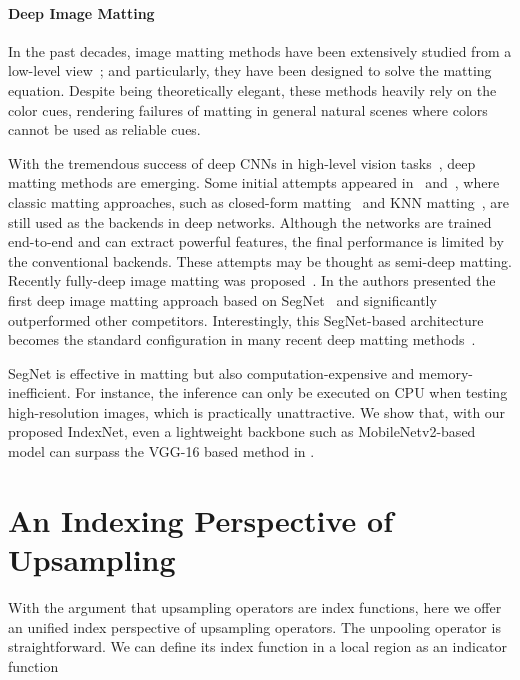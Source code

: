 \documentclass[10pt,twocolumn,letterpaper]{article}
\begin{document}
\paragraph{Deep Image Matting}

In the past decades, image matting methods have been extensively studied from a low-level view~\cite{aksoy2017designing,chen2013knn,chen2013image,chuang2001bayesian,guan2006easy,he2011global,lee2011nonlocal,levin2008closed,sun2004poisson}; and particularly, they have been designed to solve the matting equation. Despite being theoretically elegant, these methods heavily rely on the color cues, rendering failures of matting in general natural scenes where colors cannot be used as reliable cues.

With the tremendous success of deep CNNs in high-level vision tasks~\cite{girshick2014rich,krizhevsky2012imagenet,long2015fully}, deep matting methods are emerging. Some initial attempts appeared in~\cite{cho2016natural} and~\cite{shen2016deep}, where classic matting approaches, such as closed-form matting~\cite{levin2008closed} and KNN matting~\cite{chen2013knn}, are still used as the backends in deep networks. Although the networks are trained end-to-end and can extract powerful features, the final performance is limited by the conventional backends. These attempts may be thought as semi-deep matting. Recently fully-deep image matting was proposed~\cite{xu2017deep}. In \cite{xu2017deep} the authors presented the first deep image matting approach based on SegNet~\cite{badrinarayanan2017segnet} and significantly outperformed other competitors. Interestingly, this SegNet-based architecture becomes the standard configuration in many recent deep matting methods~\cite{chen2018tom,chen2018human,wang2018propagation}.

SegNet is effective in matting but also computation-expensive and memory-inefficient. For instance, the inference can only be executed on CPU when testing high-resolution images, which is practically unattractive.
We show that, with our proposed IndexNet, even a lightweight backbone such as MobileNetv2-based model can surpass the VGG-16 based method in \cite{xu2017deep}.

\section{An Indexing Perspective of Upsampling}

With the argument that upsampling operators are index functions, here we offer an unified index perspective of upsampling operators. The unpooling operator is straightforward. We can define its index function in a  local region as an indicator function
\end{document}
